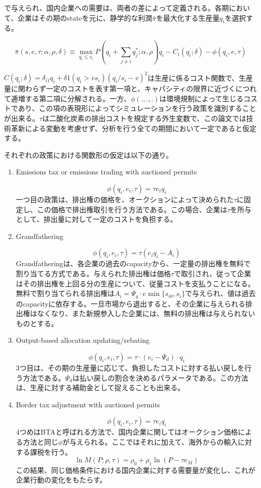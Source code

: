 \documentclass[11pt]{jsarticle}
\begin{document}
で与えられ、国内企業への需要は、両者の差によって定義される。各期において、企業はその期のstateを元に、静学的な利潤$\bar{\pi}$を最大化する生産量$q_i$を選択する。

\[
\bar{\pi}(s, e, \tau; \alpha, \rho, \delta) \equiv \max_{q_i \leq s_i} P \left( q_i + \sum_{j \neq i} q^*_j ; \alpha, \rho \right) q_i - C_i (q_i; \delta) - \phi(q_i, e, \tau)
\]

$C(q_i; \delta) = \delta_{i1}q_i + \delta 1 (q_i > v s_i) (q_i / s_i - v)^2$は生産に係るコスト関数で、生産量に関わらず一定のコストを表す第一項と、キャパシティの限界に近づくにつれて逓増する第二項に分解される。一方、$\phi(.,.,.)$は環境規制によって生じるコストであり、この項の表現形によってシミュレーションを行う政策を識別することが出来る。$\tau$は二酸化炭素の排出コストを規定する外生変数で、この論文では技術革新による変動を考慮せず、分析を行う全ての期間において一定であると仮定する。

それぞれの政策における関数形の仮定は以下の通り。

\begin{enumerate}
  \item Emissions tax or emissions trading with auctioned permits

  \[
  \phi(q_i, e_i, \tau) = \tau e_i q_i
  \]
  一つ目の政策は、排出権の価格を、オークションによって決められた$\tau$に固定し、この価格で排出権取引を行う方法である。この場合、企業は$\tau$を所与として、排出量に対して一定のコストを負担する。

  \item Grandfathering

  \[
  \phi(q_i, e_i, \tau) = \tau(e_i q_i - A_i)
  \]
  Grandfatheringは、各企業の過去のcapacityから、一定量の排出権を無料で割り当てる方式である。与えられた排出権は価格$\tau$で取引され、従って企業はその排出権を上回る分の生産について、従量コストを支払うことになる。無料で割り当てられる排出権は$A_i = \Psi_g \cdot e \min \{s_{i0}, s_i \}$で与えられ、値は過去のcapacityに依存する。一旦市場から退出すると、その企業に与えられる排出権はなくなり、また新規参入した企業には、無料の排出権は与えられないものとする。

  \item Output-based allocation updating/rebating

  \[
  \phi(q_i, e_i, \tau) = \tau \cdot (e_i - \Psi_d) \cdot q_i
  \]
  3つ目は、その期の生産量に応じて、負担したコストに対する払い戻しを行う方法である。$\Psi_d$は払い戻しの割合を決めるパラメータである。この方法は、生産に対する補助金として捉えることも出来る。

  \item Border tax adjustment with auctioned permits

  \[
  \phi(q_i, e_i, \tau) = \tau e_i q_i
  \]
  4つめはBTAと呼ばれる方法で、国内企業に関してはオークション価格による方法と同じ$\phi$が与えられる。ここではそれに加えて、海外からの輸入に対する課税を行う。
  \[
  \ln M (P; \rho, \tau) = \rho_0 + \rho_1 \ln (P - \tau e_M)
  \]
  この結果、同じ価格条件における国内企業に対する需要量が変化し、これが企業行動の変化をもたらす。

\end{enumerate}
\end{document}
